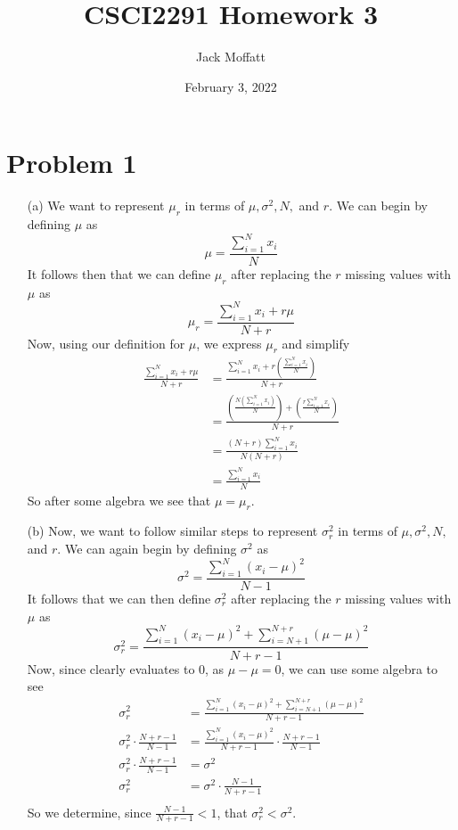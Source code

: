 \documentclass[12pt, letterpaper]{article}
\title{CSCI2291 Homework 3}
\author{Jack Moffatt}
\date{February 3, 2022}
\begin{document}
\maketitle
\noindent\makebox[\linewidth]{\rule{18cm}{0.4pt}}

\section*{Problem 1}
\begin{enumerate}
    \item [(a)] We want to represent $\mu_r$ in terms of $\mu, \sigma^2, N,$ and $r$. 
        We can begin by defining $\mu$ as 
        \[
            \mu = \frac{\sum_{i=1}^Nx_i}{N}
        \]  
        It follows then that we can define $\mu_r$ after replacing the $r$ missing values with 
        $\mu$ as 
        \[
            \mu_r = \frac{\sum_{i=1}^Nx_i + r\mu}{N+r}
        \]
        Now, using our definition for $\mu$, we express $\mu_r$ and simplify
        \begin{align*}
            \frac{\sum_{i=1}^Nx_i + r\mu}{N+r} &= \frac{\sum_{i=1}^Nx_i + r(\frac{\sum_{i=1}^Nx_i}{N})}{N+r} \\
            &= \frac{(\frac{N(\sum_{i=1}^Nx_i)}{N}) + (\frac{r\sum_{i=1}^Nx_i}{N})}{N+r} \\
            &= \frac{(N+r)\sum_{i=1}^Nx_i}{N(N + r)} \\
            &= \frac{\sum_{i=1}^Nx_i}{N}
        \end{align*}
        So after some algebra we see that $\mu = \mu_r$.
    \item [(b)] Now, we want to follow similar steps to represent $\sigma_r^2$ in terms of $\mu, \sigma^2, N,$ and $r$. 
        We can again begin by defining $\sigma^2$ as 
        \[
            \sigma^2 = \frac{\sum_{i=1}^N(x_i - \mu)^2}{N-1}
        \]  
        It follows that we can then define $\sigma_r^2$ after replacing the $r$ missing values with 
        $\mu$ as 
        \[
            \sigma_r^2 = \frac{\sum_{i=1}^N(x_i - \mu)^2 + \sum_{i=N+1}^{N+r}(\mu - \mu)^2}{N+r-1}
        \]
        Now, since clearly evaluates to 0, as $\mu - \mu = 0$, we can use some algebra to see 
        \begin{align*}
            \sigma_r^2 &= \frac{\sum_{i=1}^N(x_i - \mu)^2 + \sum_{i=N+1}^{N+r}(\mu - \mu)^2}{N+r-1} \\
            \sigma_r^2 \cdot \frac{N+r-1}{N-1}&= \frac{\sum_{i=1}^N(x_i - \mu)^2}{N+r-1} \cdot \frac{N+r-1}{N-1}\\
            \sigma_r^2 \cdot \frac{N+r-1}{N-1}&= \sigma^2 \\
            \sigma_r^2 &= \sigma^2 \cdot \frac{N-1}{N+r-1}\\
        \end{align*}
        So we determine, since $\frac{N-1}{N+r-1} < 1$, that $\sigma_r^2 < \sigma^2$.
\end{enumerate}
\end{document}

